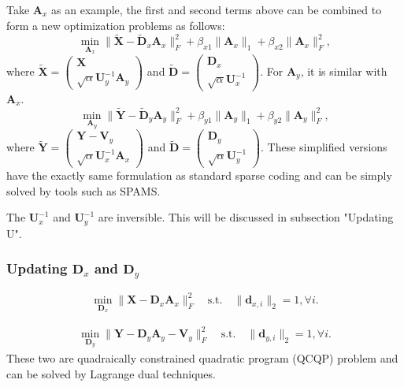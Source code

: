 \documentclass[10pt,twocolumn,letterpaper]{article}
\begin{document}
Take $\bm{A}_{x}$ as an example, the first and second terms above can be combined to form a new optimization problems as follows:
\begin{equation}
\min_{\bm{A}_{x}}
\|\widetilde{\bm{X}}-\widetilde{\bm{D}}_{x}\bm{A}_{x}\|_{F}^{2}
+
\beta_{x1}\|\bm{A}_{x}\|_{1}
+
\beta_{x2}\|\bm{A}_{x}\|_{F}^{2},
\end{equation}
where 
$
\widetilde{\bm{X}}
=
\left(\begin{array}{c}
\bm{X}
\\
\sqrt{\alpha}\bm{U}_{y}^{-1}\bm{A}_{y}
\end{array}\right)
$
and
$
\widetilde{\bm{D}}
=
\left(\begin{array}{c}
\bm{D}_{x}
\\
\sqrt{\alpha}\bm{U}_{x}^{-1}
\end{array}\right)
$.
For $\bm{A}_{y}$, it is similar with $\bm{A}_{x}$.
\begin{equation}
\min_{\bm{A}_{y}}
\|\widetilde{\bm{Y}}-\widetilde{\bm{D}}_{y}\bm{A}_{y}\|_{F}^{2}
+
\beta_{y1}\|\bm{A}_{y}\|_{1}
+
\beta_{y2}\|\bm{A}_{y}\|_{F}^{2},
\end{equation}
where 
$
\widetilde{\bm{Y}}
=
\left(\begin{array}{c}
\bm{Y}-\bm{V}_{y}
\\
\sqrt{\alpha}\bm{U}_{x}^{-1}\bm{A}_{x}
\end{array}\right)
$
and
$
\widetilde{\bm{D}}
=
\left(\begin{array}{c}
\bm{D}_{y}
\\
\sqrt{\alpha}\bm{U}_{y}^{-1}
\end{array}\right)
$.
These simplified versions have the exactly same formulation as standard sparse coding and can be simply solved by tools such as SPAMS.

The $\bm{U}_{x}^{-1}$ and $\bm{U}_{y}^{-1}$ are inversible. This will be discussed in subsection "Updating U".

\subsubsection{Updating $\bm{D}_{x}$ and $\bm{D}_{y}$}
\begin{equation}
\min_{\bm{D}_{x}}
\|\bm{X}-\bm{D}_{x}\bm{A}_{x}\|_{F}^{2}
\quad
\text{s.t.}
\quad
\|\bm{d}_{x,i}\|_{2}=1,
\forall{i}.
\end{equation}

\begin{equation}
\begin{split}
\min_{\bm{D}_{y}}
\|\bm{Y}-\bm{D}_{y}\bm{A}_{y}-\bm{V}_{y}\|_{F}^{2}
\quad 
\text{s.t.}
\quad 
\|\bm{d}_{y,i}\|_{2}=1,
\forall{i}.
\end{split}
\end{equation}
These two are quadraically constrained quadratic program (QCQP) problem and can be solved by Lagrange dual techniques.
\end{document}
